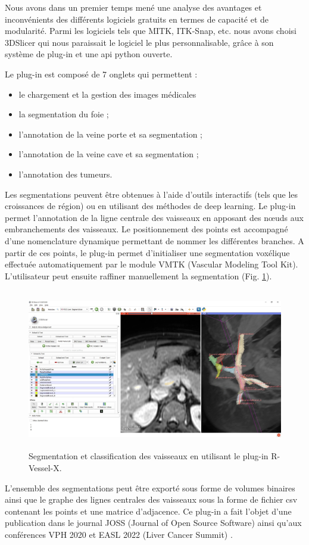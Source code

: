 Nous avons dans un premier temps mené une analyse des avantages et inconvénients des différents logiciels gratuits en termes de capacité et de modularité. Parmi les logiciels tels que MITK, ITK-Snap, etc. nous avons choisi 3DSlicer qui nous paraissait le logiciel le plus personnalisable, grâce à son système de plug-in et une api python ouverte.

Le plug-in est composé de 7 onglets qui permettent :

\begin{itemize}
    \item le chargement et la gestion des images médicales
    \item la segmentation du foie ;
    \item l'annotation de la veine porte et sa segmentation ;
    \item l'annotation de la veine cave et sa segmentation ;
    \item l'annotation des tumeurs.
\end{itemize}

Les segmentations peuvent être obtenues à l'aide d'outils interactifs (tels que les croissances de région) ou en utilisant des méthodes de deep learning. 
Le plug-in permet l'annotation de la ligne centrale des vaisseaux en apposant des nœuds aux embranchements des vaisseaux. Le positionnement des points est accompagné d'une nomenclature dynamique permettant de nommer les différentes branches. A partir de ces points, le plug-in permet d'initialiser une segmentation voxélique effectuée automatiquement par le module VMTK (Vascular Modeling Tool Kit). L'utilisateur peut ensuite raffiner manuellement la segmentation (Fig. \ref{fig:slicer_plug_in}).

\begin{figure}[!ht]
    \includegraphics[height=7cm]{Images/plug_in_segmentation.png}
    \caption{Segmentation et classification des vaisseaux en utilisant le plug-in R-Vessel-X.}
    \label{fig:slicer_plug_in}
\end{figure}

L'ensemble des segmentations peut être exporté sous forme de volumes binaires ainsi que le graphe des lignes centrales des vaisseaux sous la forme de fichier csv contenant les points et une matrice d'adjacence.
Ce plug-in a fait l'objet d'une publication dans le journal JOSS (Journal of Open Source Software) \cite{Lamy2022_JOSS} ainsi qu'aux conférences VPH 2020 \cite{Lamy2020_VPH_plugin} et EASL 2022 (Liver Cancer Summit) \cite{Lamy2022_EASL}.




